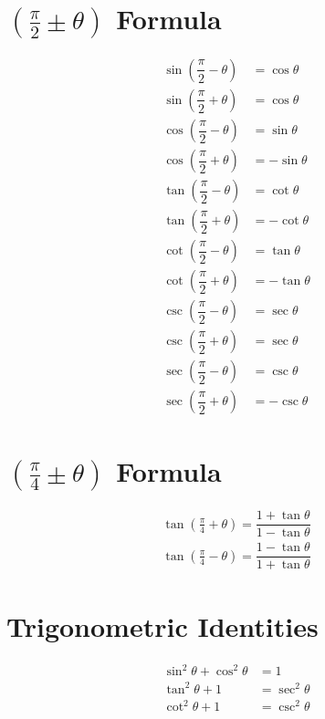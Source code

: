 \documentclass[../main.tex]{subfile}
\begin{document}
        \section{$\left(\frac{\pi}{2}\pm\theta\right)$ Formula}
        \begin{align}
            \sin \left( \dfrac{\pi}{2} - \theta \right) & = \cos \theta\\
            \sin \left( \dfrac{\pi}{2} + \theta \right) & = \cos \theta\\
            \cos \left( \dfrac{\pi}{2} - \theta\right) & = \sin \theta\\
            \cos \left( \dfrac{\pi}{2} + \theta\right) & = - \sin \theta\\
            \tan \left( \dfrac{\pi}{2} - \theta \right) & = \cot \theta\\
            \tan \left( \dfrac{\pi}{2} + \theta \right) & = - \cot \theta\\
            \cot \left( \dfrac{\pi}{2} - \theta\right) & = \tan \theta\\
            \cot \left( \dfrac{\pi}{2} + \theta\right) & = -\tan \theta\\
            \csc \left( \dfrac{\pi}{2} - \theta\right) & = \sec \theta\\
            \csc \left( \dfrac{\pi}{2} + \theta\right) & = \sec \theta\\
            \sec \left( \dfrac{\pi}{2} - \theta\right) & = \csc \theta\\
            \sec \left( \dfrac{\pi}{2} + \theta\right) & = - \csc \theta
        \end{align}
        
        \section{$\left(\frac{\pi}{4}\pm\theta\right)$ Formula}
        \begin{align}
            \tan \left( \frac{\pi}{4} + \theta \right) = \dfrac{1 + \tan \theta}{1 - \tan \theta}\\
            \tan \left( \frac{\pi}{4} - \theta \right) = \dfrac{1 - \tan \theta}{1 + \tan \theta}
        \end{align}
        
        \section{Trigonometric Identities}
        \begin{align}
            \sin^2 \theta+\cos^2 \theta & = 1\\
            \tan^2 \theta+1 & = \sec^2 \theta\\
            \cot^2 \theta+1 & = \csc^2 \theta
        \end{align}
        
\end{document}
